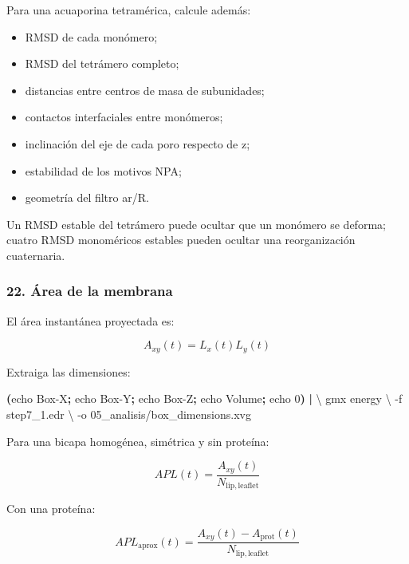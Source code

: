 \documentclass[
  spanish,
  11pt,
  a4paper]{article}
\newenvironment{Shaded}{\begin{snugshade}}{\end{snugshade}}
\newcommand{\AttributeTok}[1]{\textcolor[rgb]{0.13,0.29,0.53}{#1}}
\newcommand{\BuiltInTok}[1]{#1}
\newcommand{\DataTypeTok}[1]{\textcolor[rgb]{0.13,0.29,0.53}{#1}}
\newcommand{\ExtensionTok}[1]{#1}
\newcommand{\KeywordTok}[1]{\textcolor[rgb]{0.13,0.29,0.53}{\textbf{#1}}}
\newcommand{\NormalTok}[1]{#1}
\providecommand{\tightlist}{%
  \setlength{\itemsep}{0pt}\setlength{\parskip}{0pt}}
\begin{document}
Para una acuaporina tetramérica, calcule además:

\begin{itemize}
\tightlist
\item
  RMSD de cada monómero;
\item
  RMSD del tetrámero completo;
\item
  distancias entre centros de masa de subunidades;
\item
  contactos interfaciales entre monómeros;
\item
  inclinación del eje de cada poro respecto de z;
\item
  estabilidad de los motivos NPA;
\item
  geometría del filtro ar/R.
\end{itemize}

Un RMSD estable del tetrámero puede ocultar que un monómero se deforma;
cuatro RMSD monoméricos estables pueden ocultar una reorganización
cuaternaria.

\subsubsection{22. Área de la membrana}\label{uxe1rea-de-la-membrana}

El área instantánea proyectada es:

\[
A_{xy}(t)=L_x(t)L_y(t)
\]

Extraiga las dimensiones:

\begin{Shaded}
\begin{Highlighting}[]
\KeywordTok{(}\BuiltInTok{echo}\NormalTok{ Box{-}X}\KeywordTok{;} \BuiltInTok{echo}\NormalTok{ Box{-}Y}\KeywordTok{;} \BuiltInTok{echo}\NormalTok{ Box{-}Z}\KeywordTok{;} \BuiltInTok{echo}\NormalTok{ Volume}\KeywordTok{;} \BuiltInTok{echo}\NormalTok{ 0}\KeywordTok{)} \KeywordTok{|} \DataTypeTok{\textbackslash{}}
\ExtensionTok{gmx}\NormalTok{ energy }\DataTypeTok{\textbackslash{}}
    \AttributeTok{{-}f}\NormalTok{ step7\_1.edr }\DataTypeTok{\textbackslash{}}
    \AttributeTok{{-}o}\NormalTok{ 05\_analisis/box\_dimensions.xvg}
\end{Highlighting}
\end{Shaded}

Para una bicapa homogénea, simétrica y sin proteína:

\[
APL(t)=\frac{A_{xy}(t)}{N_{\mathrm{lip,leaflet}}}
\]

Con una proteína:

\[
APL_{\mathrm{aprox}}(t)=
\frac{A_{xy}(t)-A_{\mathrm{prot}}(t)}
     {N_{\mathrm{lip,leaflet}}}
\]
\end{document}
